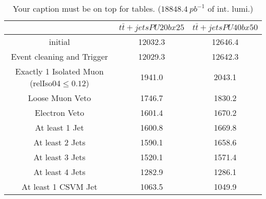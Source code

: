 \documentclass{article}
\begin{document}
\begin{table}
\caption{Your caption must be on top for tables. ($18848.4~pb^{-1}$ of int. lumi.)}
\label{tab:}
\centering
\begin{tabular}{|c|cc|}
\toprule
&$t\bar{t}+jets PU20bx25$	&$t\bar{t}+jets PU40bx50$	\\

\midrule
initial&	12032.3	&12646.4	\\

Event cleaning and Trigger&	12029.3	&12642.3	\\

Exactly 1 Isolated Muon (relIso04$\leq 0.12$)&	1941.0	&2043.1	\\

Loose Muon Veto&	1746.7	&1830.2	\\

Electron Veto&	1601.4	&1670.2	\\

At least 1 Jet&	1600.8	&1669.8	\\

At least 2 Jets&	1590.1	&1658.6	\\

At least 3 Jets&	1520.1	&1571.4	\\

At least 4 Jets&	1282.9	&1286.1	\\

At least 1 CSVM Jet&	1063.5	&1049.9	\\

\bottomrule
\end{tabular}
\end{table}
\end{document}
